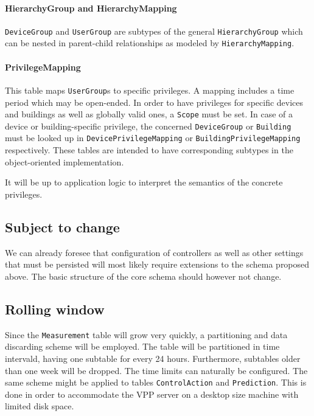 \paragraph{HierarchyGroup and HierarchyMapping} 
\texttt{DeviceGroup} and \texttt{UserGroup} are subtypes of the general \texttt{HierarchyGroup} which can be nested in parent-child relationships as modeled by \texttt{HierarchyMapping}.

\paragraph{PrivilegeMapping}
This table maps \texttt{UserGroup}s to specific privileges. A mapping includes a time period which may be open-ended. In order to have privileges for specific devices and buildings as well as globally valid ones, a \texttt{Scope} must be set. In case of a device or building-specific privilege, the concerned \texttt{DeviceGroup} or \texttt{Building} must be looked up in \texttt{DevicePrivilegeMapping} or \texttt{BuildingPrivilegeMapping} respectively. These tables are intended to have corresponding subtypes in the object-oriented implementation.

It will be up to application logic to interpret the semantics of the concrete privileges.



\subsection{Subject to change}
We can already foresee that configuration of controllers as well as other settings that must be persisted will most likely require extensions to the schema proposed above. The basic structure of the core schema should however not change.

\subsection{Rolling window}\label{subsection:rollingwindow}
Since the \texttt{Measurement} table will grow very quickly, a partitioning and data discarding scheme will be employed. The table will be partitioned in time intervald, having one subtable for every 24 hours. Furthermore, subtables older than one week will be dropped. The time limits can naturally be configured. The same scheme might be applied to tables \texttt{ControlAction} and \texttt{Prediction}.
This is done in order to accommodate the VPP server on a desktop size machine with limited disk space.

